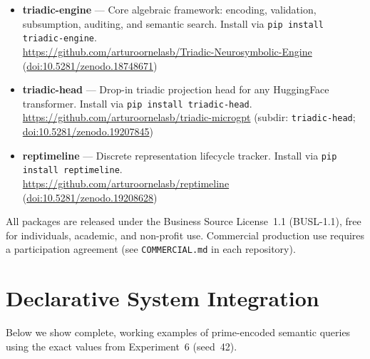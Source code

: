\documentclass[10pt]{article}
\begin{document}
{\sloppy
\begin{itemize}[nosep, leftmargin=*]
    \item \textbf{triadic-engine} --- Core algebraic framework: encoding, validation, subsumption, auditing, and semantic search. Install via \texttt{pip install triadic-engine}.\\
    \url{https://github.com/arturoornelasb/Triadic-Neurosymbolic-Engine} \enspace (\href{https://doi.org/10.5281/zenodo.18748671}{doi:10.5281/zenodo.18748671})
    \item \textbf{triadic-head} --- Drop-in triadic projection head for any HuggingFace transformer. Install via \texttt{pip install triadic-head}.\\
    \url{https://github.com/arturoornelasb/triadic-microgpt} \enspace (subdir: \texttt{triadic-head}; \href{https://doi.org/10.5281/zenodo.19207845}{doi:10.5281/zenodo.19207845})
    \item \textbf{reptimeline} --- Discrete representation lifecycle tracker. Install via \texttt{pip install reptimeline}.\\
    \url{https://github.com/arturoornelasb/reptimeline} \enspace (\href{https://doi.org/10.5281/zenodo.19208628}{doi:10.5281/zenodo.19208628})
\end{itemize}
\par}

\noindent All packages are released under the Business Source License~1.1 (BUSL-1.1), free for individuals, academic, and non-profit use. Commercial production use requires a participation agreement (see \texttt{COMMERCIAL.md} in each repository).




\appendix
\section{Declarative System Integration}
\label{sec:appendix}

Below we show complete, working examples of prime-encoded semantic queries using the exact values from Experiment~6 (seed~42).
\end{document}
